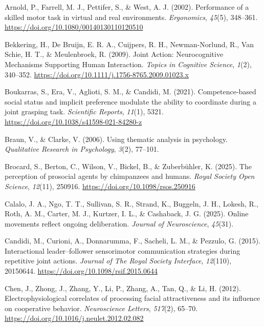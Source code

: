 \documentclass[
  11pt,
  letterpaper,
]{article}
\newlength{\cslhangindent}
\newenvironment{CSLReferences}[2] %
 {\begin{list}{}{%
  \setlength{\itemindent}{0pt}
  \setlength{\leftmargin}{0pt}
  \setlength{\parsep}{0pt}
  \ifodd #1
   \setlength{\leftmargin}{\cslhangindent}
   \setlength{\itemindent}{-1\cslhangindent}
  \fi
  \setlength{\itemsep}{#2\baselineskip}}}
 {\end{list}}
\renewcommand{\emph}[1]{\textit{#1}}  %
\begin{document}
\protect{}\label{refs}
\begin{CSLReferences}{1}{0}
Arnold, P., Farrell, M. J., Pettifer, S., \& West, A. J. (2002).
Performance of a skilled motor task in virtual and real environments.
\emph{Ergonomics}, \emph{45}(5), 348--361.
\url{https://doi.org/10.1080/00140130110120510}

Bekkering, H., De Bruijn, E. R. A., Cuijpers, R. H., Newman-Norlund, R.,
Van Schie, H. T., \& Meulenbroek, R. (2009). Joint {Action}:
{Neurocognitive Mechanisms Supporting Human Interaction}. \emph{Topics
in Cognitive Science}, \emph{1}(2), 340--352.
\url{https://doi.org/10.1111/j.1756-8765.2009.01023.x}

Boukarras, S., Era, V., Aglioti, S. M., \& Candidi, M. (2021).
Competence-based social status and implicit preference modulate the
ability to coordinate during a joint grasping task. \emph{Scientific
Reports}, \emph{11}(1), 5321.
\url{https://doi.org/10.1038/s41598-021-84280-z}

Braun, V., \& Clarke, V. (2006). Using thematic analysis in psychology.
\emph{Qualitative Research in Psychology}, \emph{3}(2), 77--101.

Brocard, S., Berton, C., Wilson, V., Bickel, B., \& Zuberbühler, K.
(2025). The perception of prosocial agents by chimpanzees and humans.
\emph{Royal Society Open Science}, \emph{12}(11), 250916.
\url{https://doi.org/10.1098/rsos.250916}

Calalo, J. A., Ngo, T. T., Sullivan, S. R., Strand, K., Buggeln, J. H.,
Lokesh, R., Roth, A. M., Carter, M. J., Kurtzer, I. L., \& Cashaback, J.
G. (2025). Online movements reflect ongoing deliberation. \emph{Journal
of Neuroscience}, \emph{45}(31).

Candidi, M., Curioni, A., Donnarumma, F., Sacheli, L. M., \& Pezzulo, G.
(2015). Interactional leader--follower sensorimotor communication
strategies during repetitive joint actions. \emph{Journal of The Royal
Society Interface}, \emph{12}(110), 20150644.
\url{https://doi.org/10.1098/rsif.2015.0644}

Chen, J., Zhong, J., Zhang, Y., Li, P., Zhang, A., Tan, Q., \& Li, H.
(2012). Electrophysiological correlates of processing facial
attractiveness and its influence on cooperative behavior.
\emph{Neuroscience Letters}, \emph{517}(2), 65--70.
\url{https://doi.org/10.1016/j.neulet.2012.02.082}


\end{CSLReferences}
\end{document}
